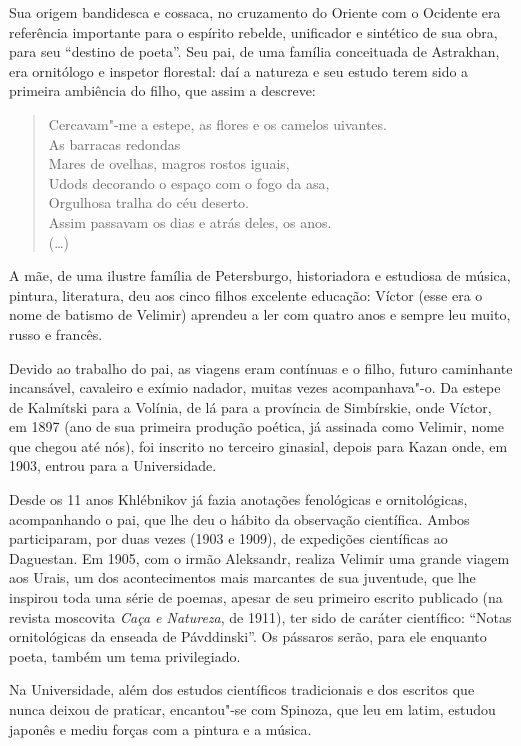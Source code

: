 Sua origem bandidesca e cossaca, no cruzamento do Oriente com o Ocidente
era referência importante para o espírito rebelde, unificador e
sintético de sua obra, para seu ``destino de poeta''. Seu pai, de uma
família conceituada de Astrakhan, era ornitólogo e inspetor florestal:
daí a natureza e seu estudo terem sido a primeira ambiência do filho,
que assim a descreve:

\begin{verse}
Cercavam"-me a estepe, as flores e os \qb{}camelos uivantes. \\
As barracas redondas \\
Mares de ovelhas, magros rostos iguais, \\
Udods decorando o espaço com o fogo da \qb{}asa, \\
Orgulhosa tralha do céu deserto. \\
Assim passavam os dias e atrás deles, os anos. \\
(\ldots{})
\end{verse}

A mãe, de uma ilustre família de Petersburgo, historiadora e estudiosa
de música, pintura, literatura, deu aos cinco filhos excelente educação:
Víctor (esse era o nome de batismo de Velimir) aprendeu a ler com quatro
anos e sempre leu muito, russo e francês.

Devido ao trabalho do pai, as viagens eram contínuas e o filho, futuro
caminhante incansável, cavaleiro e exímio nadador, muitas vezes
acompanhava"-o. Da estepe de Kalmítski para a Volínia, de lá para a
província de Simbírskie, onde Víctor, em 1897 (ano de sua primeira
produção poética, já assinada como Velimir, nome que chegou até nós), foi
inscrito no terceiro ginasial, depois para Kazan onde, em 1903, entrou
para a Universidade.

Desde os 11 anos Khlébnikov já fazia anotações fenológicas e
ornitológicas, acompanhando o pai, que lhe deu o hábito da observação
científica. Ambos participaram, por duas vezes (1903 e 1909), de
expedições científicas ao Daguestan. Em 1905, com o irmão Aleksandr,
realiza Velimir uma grande viagem aos Urais, um dos acontecimentos mais
marcantes de sua juventude, que lhe inspirou toda uma série de poemas,
apesar de seu primeiro escrito publicado (na revista moscovita
\emph{Caça e Natureza}, de 1911), ter sido de caráter científico: ``Notas
ornitológicas da enseada de Pávddinski''. Os pássaros serão, para ele
enquanto poeta, também um tema privilegiado.

Na Universidade, além dos estudos científicos tradicionais e dos
escritos que nunca deixou de praticar, encantou"-se com Spinoza, que leu
em latim, estudou japonês e mediu forças com a pintura e a música.

